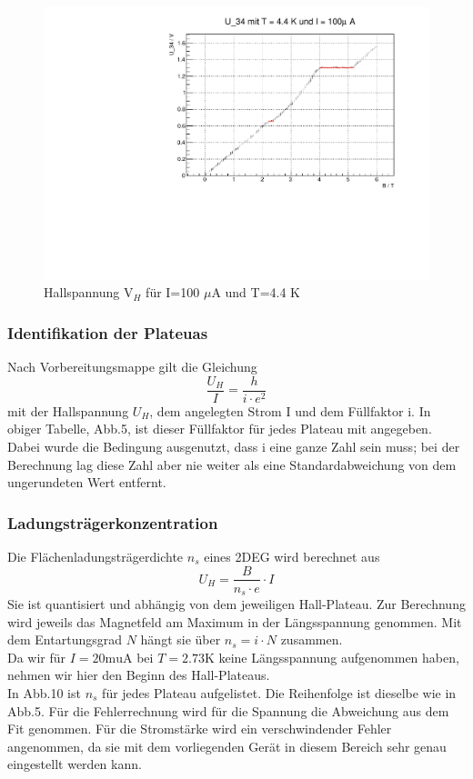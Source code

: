 \begin{figure}
\label{}
\centering
\includegraphics[scale = 0.5]{../plots/U_34_100muA_4400mK.pdf}
\caption{Hallspannung $\text{V}_H$ für I=100 $\mu$A und T=4.4 K}
\end{figure}




\FloatBarrier

\subsubsection{Identifikation der Plateuas}
Nach Vorbereitungsmappe gilt die Gleichung
$$\frac{U_H}{I} = \frac{h}{i \cdot e^{2}} $$
mit der Hallspannung $U_H$, dem angelegten Strom I und dem Füllfaktor i. In obiger Tabelle, Abb.5, ist dieser Füllfaktor für jedes Plateau mit angegeben. Dabei wurde die Bedingung ausgenutzt, dass i eine ganze Zahl sein muss; bei der Berechnung lag diese Zahl aber nie weiter als eine Standardabweichung von dem ungerundeten Wert entfernt.

\subsubsection{Ladungsträgerkonzentration}
Die Flächenladungsträgerdichte $n_s$ eines 2DEG wird berechnet aus
$$U_H = \frac{B}{n_s \cdot e} \cdot I $$
Sie ist quantisiert und abhängig von dem jeweiligen Hall-Plateau. Zur Berechnung wird jeweils das Magnetfeld am Maximum in der Längsspannung genommen. Mit dem Entartungsgrad $N$ hängt sie über $n_s = i \cdot N$ zusammen. \\
Da wir für $I = 20 \mathrm{mu A}$ bei $T = 2.73 \mathrm{K}$ keine Längsspannung aufgenommen haben, nehmen wir hier den Beginn des Hall-Plateaus. \\
In Abb.10 ist $n_s$ für jedes Plateau aufgelistet. Die Reihenfolge ist dieselbe wie in Abb.5. Für die Fehlerrechnung wird für die Spannung die Abweichung aus dem Fit genommen. Für die Stromstärke wird ein verschwindender Fehler angenommen, da sie mit dem vorliegenden Gerät in diesem Bereich sehr genau eingestellt werden kann. \\

